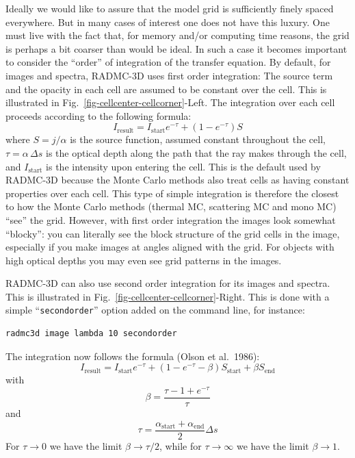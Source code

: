 \documentclass{report}
\newenvironment{asciibox}%
  {\begin{list}{}{%
    \setlength{\topsep}{0.5em}%
    \setlength{\parskip}{0em}%
    \setlength{\parsep}{0em}%
    \setlength{\itemsep}{0em}%
    \setlength{\rightmargin}{0em}%
    \setlength{\leftmargin}{3.0em}%
    \setlength{\labelsep}{1em}%
    \setlength{\labelwidth}{2em}%
  }\normalfont\footnotesize\item}
  {\end{list}}
\begin{document}
%
Ideally we would like to assure that the model grid is sufficiently finely
spaced everywhere. But in many cases of interest one does not have this
luxury. One must live with the fact that, for memory and/or computing time
reasons, the grid is perhaps a bit coarser than would be ideal. In such a
case it becomes important to consider the ``order'' of integration of the
transfer equation. By default, for images and spectra, RADMC-3D uses first
order integration: The source term and the opacity in each cell are assumed
to be constant over the cell. This is illustrated in
Fig.~\ref{fig-cellcenter-cellcorner}-Left. The integration over each cell
proceeds according to the following formula:
\begin{equation}
I_{\mathrm{result}} = I_{\mathrm{start}}e^{-\tau} + (1-e^{-\tau})S
\end{equation}
where $S=j/\alpha$ is the source function, assumed constant throughout the
cell, $\tau=\alpha\,\Delta s$ is the optical depth along the path that the
ray makes through the cell, and $I_{\mathrm{start}}$ is the intensity upon
entering the cell. This is the default used by RADMC-3D because the Monte
Carlo methods also treat cells as having constant properties over each
cell. This type of simple integration is therefore the closest to how the
Monte Carlo methods (thermal MC, scattering MC and mono MC) ``see'' the
grid. However, with first order integration the images look somewhat
``blocky'': you can literally see the block structure of the grid cells in
the image, especially if you make images at angles aligned with the
grid. For objects with high optical depths you may even see grid patterns in
the images.

RADMC-3D can also use second order integration for its images and spectra.
This is illustrated in Fig.~\ref{fig-cellcenter-cellcorner}-Right.
This is done with a simple ``{\small\tt secondorder}'' option added on the
command line, for instance:
\begin{asciibox}\begin{verbatim}
radmc3d image lambda 10 secondorder
\end{verbatim}\end{asciibox}
The integration now follows the formula (Olson et al.\ 1986):
\begin{equation}
I_{\mathrm{result}} = I_{\mathrm{start}}e^{-\tau} + (1-e^{-\tau}-\beta) S_{\mathrm{start}}
+ \beta S_{\mathrm{end}}
\end{equation}
with
\begin{equation}
\beta = \frac{\tau-1+e^{-\tau}}{\tau}
\end{equation}
and
\begin{equation}
\tau = \frac{\alpha_{\mathrm{start}}+\alpha_{\mathrm{end}}}{2}\Delta s
\end{equation}
For $\tau\rightarrow 0$ we have the limit $\beta\rightarrow \tau/2$, while
for $\tau\rightarrow \infty$ we have the limit $\beta\rightarrow 1$. 
\end{document}

